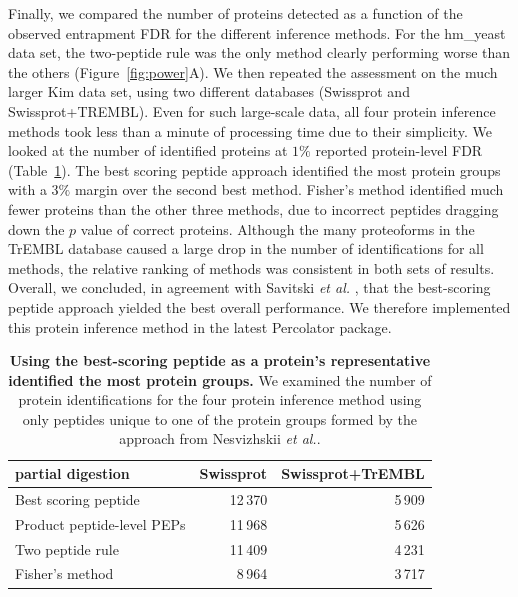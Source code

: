 \documentclass{article}
\begin{document}
Finally, we compared the number of proteins detected as a function of
the observed entrapment FDR for the different inference methods.  For
the hm\_yeast data set, the two-peptide rule was the only method
clearly performing worse than the others (Figure~\ref{fig:power}A).
We then repeated the assessment on the much larger Kim data set, using
two different databases (Swissprot and Swissprot+TREMBL).  Even for
such large-scale data, all four protein inference methods took less
than a minute of processing time due to their simplicity. We looked at
the number of identified proteins at $1\%$ reported protein-level FDR
(Table~\ref{tab:pandey-stats}).  The best scoring peptide approach
identified the most protein groups with a $3\%$ margin over the second
best method. Fisher's method identified much fewer proteins than the
other three methods, due to incorrect peptides dragging down the $p$
value of correct proteins.%
Although the many proteoforms in the TrEMBL database caused a large
drop in the number of identifications for all methods, the relative
ranking of methods was consistent in both sets of results. Overall, we
concluded, in agreement with Savitski {\em et al.}
\cite{savitski2015scalable}, that the best-scoring peptide approach
yielded the best overall performance.  We therefore implemented this
protein inference method in the latest Percolator package.

\begin{table}
  \begin{center}
    \begin{tabular}{lrr}
    \hline
    partial digestion & Swissprot & Swissprot+TrEMBL\\
    \hline
    Best scoring peptide & 12\,370 & 5\,909\\
    Product peptide-level PEPs & 11\,968 & 5\,626\\
    Two peptide rule & 11\,409 & 4\,231\\
    Fisher's method & 8\,964 & 3\,717\\
    \hline
    \end{tabular}
  \end{center}
\caption{\label{tab:pandey-stats}\textbf{Using the best-scoring
    peptide as a protein's representative identified the most protein
    groups.} We examined the number of protein identifications for the
  four protein inference method using only peptides unique to one of
  the protein groups formed by the approach from Nesvizhskii {\em et
    al.}. }
\end{table}
\end{document}
